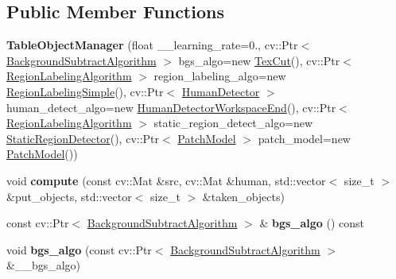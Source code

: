 \subsection*{Public Member Functions}
\begin{DoxyCompactItemize}
\item 
\hypertarget{classskl_1_1_table_object_manager_a2be8e2e0549d00e2294c7afcaf09925a}{}\label{classskl_1_1_table_object_manager_a2be8e2e0549d00e2294c7afcaf09925a} 
{\bfseries Table\+Object\+Manager} (float \+\_\+\+\_\+learning\+\_\+rate=0., cv\+::\+Ptr$<$ \hyperlink{classskl_1_1_background_subtract_algorithm}{Background\+Subtract\+Algorithm} $>$ bgs\+\_\+algo=new \hyperlink{classskl_1_1_tex_cut}{Tex\+Cut}(), cv\+::\+Ptr$<$ \hyperlink{classskl_1_1_filter_mat2_mat}{Region\+Labeling\+Algorithm} $>$ region\+\_\+labeling\+\_\+algo=new \hyperlink{classskl_1_1_region_labeling_simple}{Region\+Labeling\+Simple}(), cv\+::\+Ptr$<$ \hyperlink{classskl_1_1_filter_mat2_mat}{Human\+Detector} $>$ human\+\_\+detect\+\_\+algo=new \hyperlink{classskl_1_1_human_detector_workspace_end}{Human\+Detector\+Workspace\+End}(), cv\+::\+Ptr$<$ \hyperlink{classskl_1_1_filter_mat2_mat}{Region\+Labeling\+Algorithm} $>$ static\+\_\+region\+\_\+detect\+\_\+algo=new \hyperlink{classskl_1_1_static_region_detector}{Static\+Region\+Detector}(), cv\+::\+Ptr$<$ \hyperlink{classskl_1_1_patch_model}{Patch\+Model} $>$ patch\+\_\+model=new \hyperlink{classskl_1_1_patch_model}{Patch\+Model}())
\item 
\hypertarget{classskl_1_1_table_object_manager_a523dae27c643a43c2e1cac927d468ded}{}\label{classskl_1_1_table_object_manager_a523dae27c643a43c2e1cac927d468ded} 
void {\bfseries compute} (const cv\+::\+Mat \&src, cv\+::\+Mat \&human, std\+::vector$<$ size\+\_\+t $>$ \&put\+\_\+objects, std\+::vector$<$ size\+\_\+t $>$ \&taken\+\_\+objects)
\item 
\hypertarget{classskl_1_1_table_object_manager_acc23bf35d4261ec51183024ee8369dcb}{}\label{classskl_1_1_table_object_manager_acc23bf35d4261ec51183024ee8369dcb} 
const cv\+::\+Ptr$<$ \hyperlink{classskl_1_1_background_subtract_algorithm}{Background\+Subtract\+Algorithm} $>$ \& {\bfseries bgs\+\_\+algo} () const
\item 
\hypertarget{classskl_1_1_table_object_manager_a3f4b53cccceb62c45e20296b6ef82229}{}\label{classskl_1_1_table_object_manager_a3f4b53cccceb62c45e20296b6ef82229} 
void {\bfseries bgs\+\_\+algo} (const cv\+::\+Ptr$<$ \hyperlink{classskl_1_1_background_subtract_algorithm}{Background\+Subtract\+Algorithm} $>$ \&\+\_\+\+\_\+bgs\+\_\+algo)

\end{DoxyCompactItemize}

